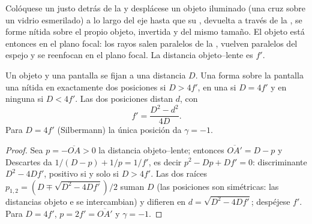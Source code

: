 \begin{method}[Autocolimación]\label{met:b1:mirrors-thin-lenses:autocollimation}
Colóquese un  justo detrás de la  y desplácese un objeto
iluminado (una cruz sobre un vidrio esmerilado) a lo largo del eje hasta
que su , devuelta a través de la , se forme nítida sobre el
propio objeto, invertida y del mismo tamaño. El objeto está entonces en el
plano focal: los rayos salen paralelos de la , vuelven paralelos del
espejo y se reenfocan en el plano focal. La distancia objeto--lente es $f'$.
\end{method}

\begin{proposition}\label{prop:b1:mirrors-thin-lenses:bessel}
Un objeto y una pantalla se fijan a una distancia $D$. Una  forma sobre la pantalla una  nítida en exactamente
dos posiciones si $D > 4f'$, en una si $D = 4f'$ y en ninguna si
$D < 4f'$. Las dos posiciones distan $d$, con
\[
f' = \frac{D^2 - d^2}{4D} .
\]
Para $D = 4f'$ (Silbermann) la única posición da $\gamma = -1$.
\end{proposition}

\begin{proof}
Sea $p = -\overline{OA} > 0$ la distancia objeto--lente; entonces
$\overline{OA'} = D - p$ y Descartes da $1/(D - p) + 1/p = 1/f'$,
es decir $p^2 - Dp + Df' = 0$: discriminante $D^2 - 4Df'$, positivo si y
solo si $D > 4f'$. Las dos raíces $p_{1,2} = (D \mp \sqrt{D^2 - 4Df'})/2$
suman $D$ (las posiciones son simétricas: las distancias objeto e 
se intercambian) y difieren en $d = \sqrt{D^2 - 4Df'}$; despéjese $f'$. Para
$D = 4f'$, $p = 2f' = \overline{OA'}$ y $\gamma = -1$.
\end{proof}

